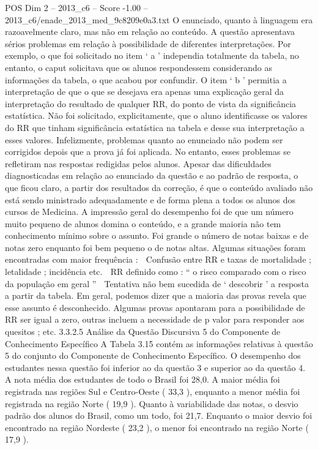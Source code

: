 \begin{textsample}{POS Dim 2 – 2013\_c6 – Score -1.00 – 2013\_c6/enade\_2013\_med\_9c8209e0a3.txt}
O enunciado, quanto à linguagem era razoavelmente claro, mas não em relação ao conteúdo.
A questão apresentava sérios problemas em relação à possibilidade de diferentes interpretações.
Por exemplo, o que foi solicitado no item ‘ a ’ independia totalmente da tabela, no entanto, o caput solicitava que os alunos respondessem considerando as informações da tabela, o que acabou por confundir.
O item ‘ b ’ permitia a interpretação de que o que se desejava era apenas uma explicação geral da interpretação do resultado de qualquer RR, do ponto de vista da significância estatística.
Não foi solicitado, explicitamente, que o aluno identificasse os valores do RR que tinham significância estatística na tabela e desse sua interpretação a esses valores.
Infelizmente, problemas quanto ao enunciado não podem ser corrigidos depois que a prova já foi aplicada.
No entanto, esses problemas se refletiram nas respostas redigidas pelos alunos.
Apesar das dificuldades diagnosticadas em relação ao enunciado da questão e ao padrão de resposta, o que ficou claro, a partir dos resultados da correção, é que o conteúdo avaliado não está sendo ministrado adequadamente e de forma plena a todos os alunos dos cursos de Medicina.
A impressão geral do desempenho foi de que um número muito pequeno de alunos domina o conteúdo, e a grande maioria não tem conhecimento mínimo sobre o assunto.
Foi grande o número de notas baixas e de notas zero enquanto foi bem pequeno o de notas altas.
Algumas situações foram encontradas com maior frequência :  Confusão entre RR e taxas de mortalidade ; letalidade ; incidência etc.  RR definido como : “ o risco comparado com o risco da população em geral ”  Tentativa não bem sucedida de ‘ descobrir ’ a resposta a partir da tabela.
Em geral, podemos dizer que a maioria das provas revela que esse assunto é desconhecido.
Algumas provas apontaram para a possibilidade de RR ser igual a zero, outras incluem a necessidade de p valor para responder aos quesitos ; etc. 3.3.2.5 Análise da Questão Discursiva 5 do Componente de Conhecimento Específico A Tabela 3.15 contém as informações relativas à questão 5 do conjunto do Componente de Conhecimento Específico.
O desempenho dos estudantes nessa questão foi inferior ao da questão 3 e superior ao da questão 4.
A nota média dos estudantes de todo o Brasil foi 28,0.
A maior média foi registrada nas regiões Sul e Centro-Oeste ( 33,3 ), enquanto a menor média foi registrada na região Norte ( 19,9 ).
Quanto à variabilidade das notas, o desvio padrão dos alunos do Brasil, como um todo, foi 21,7.
Enquanto o maior desvio foi encontrado na região Nordeste ( 23,2 ), o menor foi encontrado na região Norte ( 17,9 ).

\end{textsample}
